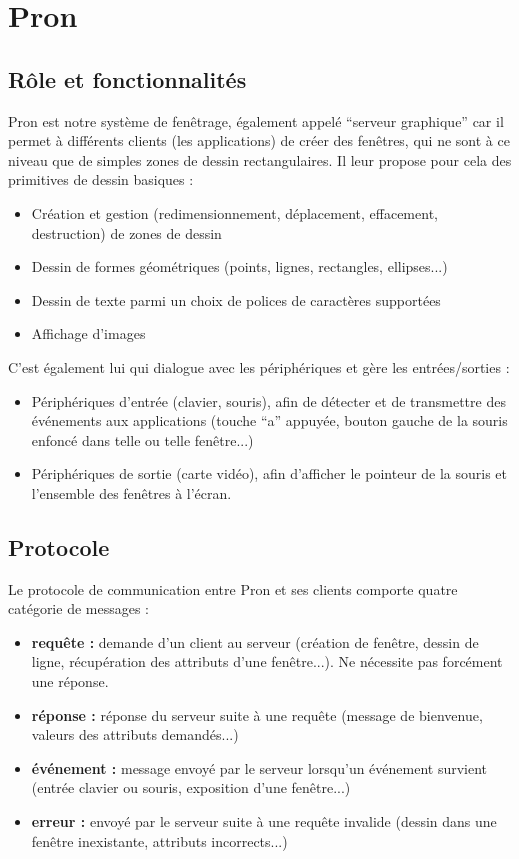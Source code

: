 \section{Pron}

\subsection{Rôle et fonctionnalités}

Pron est notre système de fenêtrage, également appelé ``serveur graphique'' car il permet à différents clients (les applications) de créer des fenêtres, qui ne sont à ce niveau que de simples zones de dessin rectangulaires. Il leur propose pour cela des primitives de dessin basiques :
\begin{itemize}
\item Création et gestion (redimensionnement, déplacement, effacement, destruction) de zones de dessin
\item Dessin de formes géométriques (points, lignes, rectangles, ellipses...)
\item Dessin de texte parmi un choix de polices de caractères supportées
\item Affichage d'images
\end{itemize}

\vspace{1em}

C'est également lui qui dialogue avec les périphériques et gère les entrées/sorties :
\begin{itemize}
  \item Périphériques d'entrée (clavier, souris), afin de détecter et de transmettre des événements aux applications (touche ``a'' appuyée, bouton gauche de la souris enfoncé dans telle ou telle fenêtre...)
  \item Périphériques de sortie (carte vidéo), afin d'afficher le pointeur de la souris et l'ensemble des fenêtres à l'écran.
\end{itemize}

\subsection{Protocole}

Le protocole de communication entre Pron et ses clients comporte quatre catégorie de messages :
\begin{itemize}
  \item \textbf{requête :} demande d'un client au serveur (création de fenêtre, dessin de ligne, récupération des attributs d'une fenêtre...). Ne nécessite pas forcément une réponse.
  \item \textbf{réponse :} réponse du serveur suite à une requête (message de bienvenue, valeurs des attributs demandés...)
  \item \textbf{événement :} message envoyé par le serveur lorsqu'un événement survient (entrée clavier ou souris, exposition d'une fenêtre...)
  \item \textbf{erreur :} envoyé par le serveur suite à une requête invalide (dessin dans une fenêtre inexistante, attributs incorrects...)
\end{itemize}

